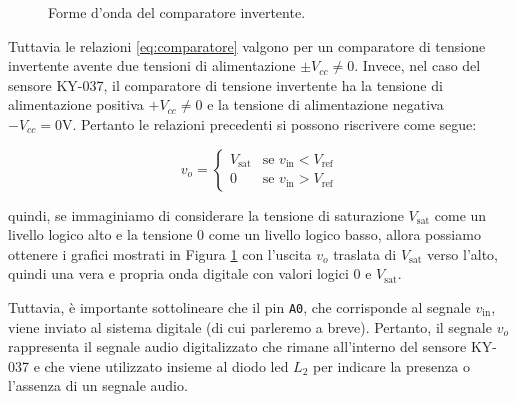 \documentclass[a4paper,12pt]{report}  %
\newcommand{\lstinlinebg}[1]{\colorbox{backcolour}{\lstinline|#1|}}
\begin{document}
\begin{figure}[h]
    \caption{Forme d'onda del comparatore invertente.}
    \label{fig:waveforms}
\end{figure}

Tuttavia le relazioni \eqref{eq:comparatore} valgono per un comparatore di tensione invertente avente due tensioni di alimentazione $\pm V_{cc} \neq 0$.
Invece, nel caso del sensore KY-037, il comparatore di tensione invertente ha la tensione di alimentazione positiva $+V_{cc} \neq 0$ e la tensione di alimentazione negativa $-V_{cc} = 0 \text{V}$.
Pertanto le relazioni precedenti si possono riscrivere come segue:

\begin{equation}
    v_{o} = \begin{cases}
        V_{\text{sat}} & \text{se } v_{\text{in}} < V_{\text{ref}} \\
        0  & \text{se } v_{\text{in}} > V_{\text{ref}}
    \end{cases} \nonumber
\end{equation}

quindi, se immaginiamo di considerare la tensione di saturazione $V_{\text{sat}}$ come un livello logico alto e la tensione $0$ come un livello logico basso, allora possiamo ottenere i grafici mostrati in Figura \ref{fig:waveforms} con l'uscita $v_o$ traslata di $V_{\text{sat}}$ verso l'alto, quindi una vera e propria onda digitale con valori logici $0$ e $V_{\text{sat}}$.
        
Tuttavia, è importante sottolineare che il pin \lstinlinebg{A0}, che corrisponde al segnale $v_{\text{in}}$, viene inviato al sistema digitale (di cui parleremo a breve).
Pertanto, il segnale $v_{o}$ rappresenta il segnale audio digitalizzato che rimane all'interno del sensore KY-037 e che viene utilizzato insieme al diodo led $L_2$ per indicare la presenza o l'assenza di un segnale audio. 
\end{document}
